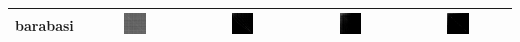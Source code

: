 \documentclass{article}
\begin{document}
\begin{table}[h]
\begin{tabular}{l | c c c c}
\hline
barabasi
&
    \includegraphics[width=0.23\textwidth]{../img/barabasi/adjacency-matrix-random-ordering.png}
& 
    \includegraphics[width=0.23\textwidth]{../img/barabasi/adjacency-matrix-given-ordering.png}
& 
    \includegraphics[width=0.23\textwidth]{../img/barabasi/adjacency-matrix-degree-ordering.png}
& 
    \includegraphics[width=0.23\textwidth]{../img/barabasi/adjacency-matrix-slashburn-ordering.png} \\
    \hline
\end{tabular}
\end{table}
\end{document}
